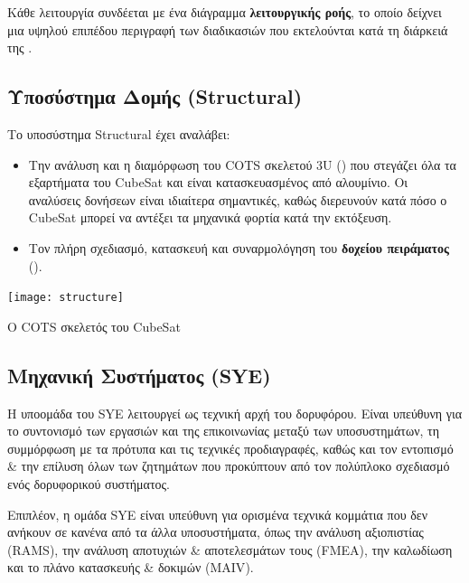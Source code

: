 \documentclass[a4paper,nobib]{tufte-book}
\begin{document}
Κάθε λειτουργία συνδέεται με ένα διάγραμμα \textbf{λειτουργικής ροής}, το οποίο δείχνει μια υψηλού επιπέδου περιγραφή των διαδικασιών που εκτελούνται κατά τη διάρκειά της \autocite{acubesat_functional_2021}.



\subsection{Υποσύστημα Δομής (Structural)}

Το υποσύστημα Structural έχει αναλάβει:
\begin{itemize}
	\item Την ανάλυση και η διαμόρφωση του \ac{COTS} σκελετού 3U () που στεγάζει όλα τα εξαρτήματα του CubeSat και είναι κατασκευασμένος από αλουμίνιο. Οι αναλύσεις δονήσεων είναι ιδιαίτερα σημαντικές, καθώς διερευνούν κατά πόσο ο CubeSat μπορεί να αντέξει τα μηχανικά φορτία κατά την εκτόξευση.
	\item Τον πλήρη σχεδιασμό, κατασκευή και συναρμολόγηση του \textbf{δοχείου πειράματος} ().
\end{itemize}

\begin{marginfigure}
	\centering
	\texttt{[image: structure]}
	\caption{Ο \acs{COTS} σκελετός του CubeSat}
	\label{fig:structure}
\end{marginfigure}

\subsection{Μηχανική Συστήματος (\acs{SYE})}

Η υποομάδα του \acl{SYE} λειτουργεί ως τεχνική αρχή του δορυφόρου. Είναι υπεύθυνη για το συντονισμό των εργασιών και της επικοινωνίας μεταξύ των υποσυστημάτων, τη συμμόρφωση με τα πρότυπα και τις τεχνικές προδιαγραφές, καθώς και τον εντοπισμό \& την επίλυση όλων των ζητημάτων που προκύπτουν από τον πολύπλοκο σχεδιασμό ενός δορυφορικού συστήματος.

Επιπλέον, η ομάδα \ac{SYE} είναι υπεύθυνη για ορισμένα τεχνικά κομμάτια που δεν ανήκουν σε κανένα από τα άλλα υποσυστήματα, όπως την ανάλυση αξιοπιστίας (\acs{RAMS}), την ανάλυση αποτυχιών \& αποτελεσμάτων τους (\ac{FMEA}), την καλωδίωση και το πλάνο κατασκευής \& δοκιμών (\acs{MAIV}).
\end{document}
